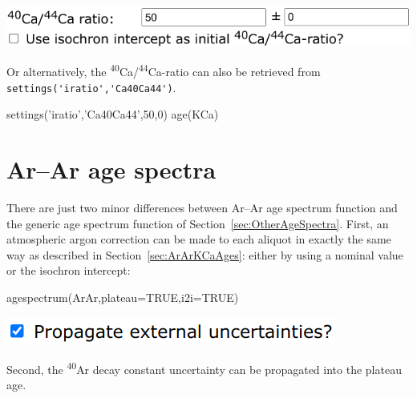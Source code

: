 \begin{refsection}
\noindent\begin{minipage}[t]{.55\linewidth}
\strut\vspace*{-\baselineskip}\newline
\includegraphics[width=\linewidth]{../figures/KCaNominalInitials.png}
\end{minipage}
\begin{minipage}[t]{.45\linewidth}
Or alternatively, the
\textsuperscript{40}Ca/\textsuperscript{44}Ca-ratio can also be
retrieved from \verb|settings('iratio','Ca40Ca44')|.
\end{minipage}

\begin{script}
settings('iratio','Ca40Ca44',50,0)
age(KCa)
\end{script}

\section{Ar--Ar age spectra}\label{sec:ArArAgeSpectra}

There are just two minor differences between Ar--Ar age spectrum
function and the generic age spectrum function of
Section~\ref{sec:OtherAgeSpectra}. First, an atmospheric argon
correction can be made to each aliquot in exactly the same way as
described in Section~\ref{sec:ArArKCaAges}: either by using a nominal
value or the isochron intercept:

\begin{console}
agespectrum(ArAr,plateau=TRUE,i2i=TRUE)
\end{console}

\noindent\begin{minipage}[t]{.35\linewidth}
\strut\vspace*{-\baselineskip}\newline
\includegraphics[width=\linewidth]{../figures/ArArExterr.png}
\end{minipage}
\begin{minipage}[t]{.65\linewidth}
Second, the \textsuperscript{40}Ar decay constant uncertainty can be
propagated into the plateau age.
\end{minipage}


\end{refsection}
